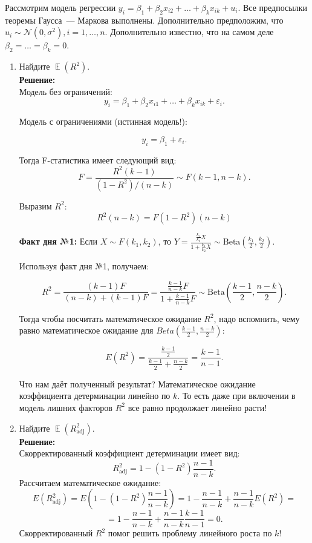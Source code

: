 \documentclass[12pt]{article}
\DeclareMathOperator{\E}{\mathbb{E}}
\newcommand{\cN}{\mathcal{N}}
\newcommand{\dBeta}{\mathrm{Beta}}
\renewcommand{\u}{u}
\newcommand{\adj}{\text{adj}}
\begin{document}
\begin{problem}
Рассмотрим модель регрессии $y_i = \beta_1 + \beta_2x_{i2} + \dots +\beta_kx_{ik} + \u_i$. 
Все предпосылки теоремы Гаусса~— Маркова выполнены. 
Дополнительно предположим, что $\u_i \sim \cN(0,\sigma^2), i=1, \dots, n$. 
Дополнительно известно, что на самом деле $\beta_2 = \dots = \beta_k = 0$.
\begin{enumerate}
\item Найдите $\E(R^2)$.\\

\textbf{Решение:}\\
Модель без ограничений: 
\[
y_i = \beta_1 + \beta_2x_{i1} + \dots +\beta_kx_{ik} + \varepsilon_i.
\]

Модель с ограничениями (истинная модель!):

\[
y_i = \beta_1 + \varepsilon_i.
\]

Тогда F-статистика имеет следующий вид:
\[
F = \frac{R^2(k-1)}{(1-R^2)/(n-k)} \sim F(k-1,n-k).
\]

Выразим $R^2$:
\[
R^2(n-k) = F(1-R^2)(n-k)
\]

\textbf{Факт дня №1:} Если $X \sim F(k_1,k_2)$, то $Y = \frac{\frac{k_1}{k_2}X}{1+\frac{k_1}{k_2}X} \sim \dBeta \left(\frac{k_1}{2}, \frac{k_2}{2}\right)$.

Используя факт дня №1, получаем:

\[
R^2 = \frac{(k-1)F}{(n-k) + (k-1)F} = \frac{\frac{k-1}{n-k}F}{1+\frac{k-1}{n-k}F} \sim \dBeta\left(\frac{k-1}{2},\frac{n-k}{2}\right).
\]

Тогда чтобы посчитать математическое ожидание $R^2$, надо вспомнить, чему равно математическое ожидание для $Beta\left(\frac{k-1}{2},\frac{n-k}{2}\right)$:

\[
E(R^2) = \frac{\frac{k-1}{2}}{\frac{k-1}{2}+\frac{n-k}{2}} = \frac{k-1}{n-1}.
\]

Что нам даёт полученный результат? Математическое ожидание коэффициента детерминации линейно по $k$. То есть даже при включении в модель лишних факторов $R^2$ все равно продолжает линейно расти!
\item Найдите $\E(R^2_{\adj})$.\\
\textbf{Решение:}\\
Скорректированный коэффициент детерминации имеет вид:
\[
R^2_{\adj} = 1 - \left(1 - R^2\right)\frac{n-1}{n-k}.
\]
Рассчитаем математическое ожидание:
\[
E(R^2_{\adj}) = E\left(1 - \left(1 - R^2\right)\frac{n-1}{n-k}\right) = 1-\frac{n-1}{n-k}+\frac{n-1}{n-k}E(R^2) = 
\]
\[
= 1-\frac{n-1}{n-k}+\frac{n-1}{n-k}\frac{k-1}{n-1} = 0.
\]
Скорректированный $R^2$ помог решить проблему линейного роста по $k$!
\end{enumerate}
\end{problem}
\end{document}
